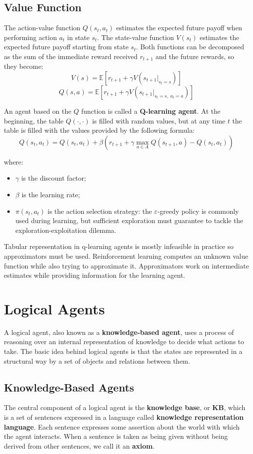 \documentclass{article}
\begin{document}
\subsection{Value Function}
The action-value function $Q(s_t, a_t)$ estimates the expected future payoff when performing action $a_t$ in state $s_t$. The state-value function $V(s_t)$ estimates the expected future payoff starting from state $s_t$. Both functions can be decomposed as the sum of the immediate reward received $r_{t+1}$ and the future rewards, so they become:
$$V(s) = \mathbb{E}[r_{t+1}+\gamma V(s_{t+1}|_{s_t=s})]$$
$$Q(s,a) = \mathbb{E}[r_{t+1}+\gamma  V(s_{t+1}|_{s_t =s,\; a_t = a})]$$

An agent based on the $Q$ function is called a \textbf{Q-learning agent}. At the beginning, the table $Q(\cdot, \cdot)$ is filled with random values, but at any time $t$ the table is filled with the values provided by the following formula:
$$Q(s_t, a_t) = Q(s_t, a_t) + \beta(r_{t+1} + \gamma  \max_{a\in A}Q(s_{t+1}, a) - Q(s_t, a_t)) $$

\clearpage
\noindent
where:
\begin{itemize}
    \item $\gamma$ is the discount factor;
    \item $\beta$ is the learning rate;
    \item $\pi(s_t, a_t)$ is the action selection strategy: the $\varepsilon$-greedy policy is commonly used during learning, but sufficient exploration must guarantee to tackle the exploration-exploitation dilemma.
\end{itemize}

Tabular representation in q-learning agents is mostly infeasible in practice so approximators must be used. Reinforcement learning computes an unknown value function while also trying to approximate it. Approximators work on intermediate estimates while providing information for the learning agent.

\clearpage
\section{Logical Agents}
A logical agent, also known as a \textbf{knowledge-based agent}, uses a process of reasoning over an internal representation of knowledge to decide what actions to take. The basic idea behind logical agents is that the states are represented in a structural way by a set of objects and relations between them. 

\subsection{Knowledge-Based Agents}
The central component of a logical agent is the \textbf{knowledge base}, or \textbf{KB}, which is a set of sentences expressed in a language called \textbf{knowledge representation language}. Each sentence expresses some assertion about the world with which the agent interacts. When a sentence is taken as being given without being derived from other sentences, we call it an \textbf{axiom}.
\end{document}
